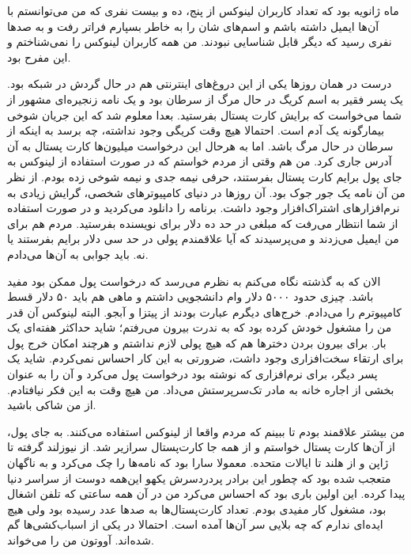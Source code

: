 ماه ژانویه بود که تعداد کاربران لینوکس از پنج، ده و بیست نفری که من
می‌توانستم با آن‌ها ایمیل داشته باشم و اسم‌های شان را به خاطر بسپارم
فراتر رفت و به صدها نفری رسید که دیگر قابل شناسایی نبودند. من همه
کاربران لینوکس را نمی‌شناختم و این مفرح بود.

درست در همان روزها یکی از این دروغ‌های اینترنتی هم در حال گردش در شبکه
بود. یک پسر فقیر به اسم کریگ در حال مرگ از سرطان بود
و یک نامه زنجیره‌ای مشهور از شما می‌خواست که برایش کارت پستال
بفرستید. بعدا معلوم شد که این جریان شوخی‌ بیمارگونه یک آدم است. احتمالا
هیچ وقت کریگی وجود نداشته، چه برسد به اینکه از سرطان در حال مرگ
باشد. اما به هرحال این درخواست میلیون‌ها کارت پستال به آن آدرس جاری
کرد. من هم وقتی از مردم خواستم که در صورت استفاده از لینوکس به جای پول
برایم کارت پستال بفرستند، حرفی نیمه جدی و نیمه شوخی زده بودم. از نظر
من آن نامه یک جور جوک  بود. آن روزها در دنیای کامپیوترهای شخصی، گرایش زیادی به
نرم‌افزارهای اشتراک‌افزار وجود داشت. برنامه را
دانلود می‌کردید و در صورت استفاده از شما انتظار می‌رفت که مبلغی در حد ده
دلار برای نویسنده بفرستید. مردم هم برای من ایمیل می‌زدند و می‌پرسیدند که
آیا علاقمندم پولی در حد سی دلار برایم بفرستند یا نه. باید جوابی به
آن‌ها می‌دادم.

الان که به گذشته نگاه می‌کنم به نظرم می‌رسد که درخواست پول ممکن بود مفید
باشد. چیزی حدود ۵۰۰۰ دلار وام دانشجویی داشتم و ماهی هم باید ۵۰ دلار
قسط کامپیوترم را می‌دادم. خرج‌های دیگرم عبارت بودند از پیتزا و
آبجو. البته لینوکس آن قدر من را مشغول خودش کرده بود که به ندرت بیرون
می‌رفتم؛ شاید حداکثر هفته‌ای یک بار. برای بیرون بردن دخترها هم که هیچ
پولی لازم نداشتم و هرچند امکان خرج پول برای ارتقاء سخت‌افزاری وجود
داشت، ضرورتی به این کار احساس نمی‌کردم. شاید یک پسر دیگر، برای
نرم‌افزاری که نوشته بود درخواست پول می‌کرد و آن را به عنوان بخشی از
اجاره خانه به مادر تک‌سرپرستش می‌داد. من هیچ وقت به این فکر نیافتادم. از
من شاکی باشید.

من بیشتر علاقمند بودم تا ببینم که مردم واقعا از لینوکس استفاده
می‌کنند. به جای پول، از آن‌ها کارت پستال خواستم و از همه جا کارت‌پستال
سرازیر شد. از نیوزلند گرفته تا ژاپن و از هلند تا ایالات متحده. معمولا
سارا بود که نامه‌ها را چک می‌کرد و به ناگهان متعجب شده بود که چطور این
برادر پردردسرش یکهو این‌همه دوست از سراسر دنیا پیدا کرده. این اولین
باری بود که احساس می‌کرد من در آن همه ساعتی که تلفن اشغال بود، مشغول
کار مفیدی بودم. تعداد کارت‌پستال‌ها به صدها عدد رسیده بود ولی هیچ ایده‌ای
ندارم که چه بلایی سر آن‌ها آمده است. احتمالا در یکی از اسباب‌کشی‌ها گم
شده‌اند. آووتون من را  می‌خواند.

